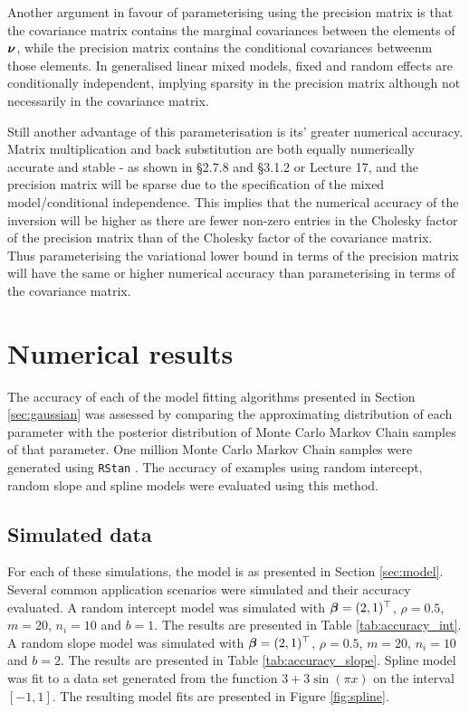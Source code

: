 Another argument in favour of parameterising using the precision matrix is that
the covariance matrix contains the marginal covariances between the elements of
${\boldsymbol \nu}$, while the precision matrix contains the conditional covariances
betweenm those elements. In generalised linear mixed models, fixed and random
effects are conditionally independent, implying sparsity in the precision
matrix although not necessarily in the covariance matrix.

Still another advantage of this parameterisation is its' greater numerical
accuracy.  Matrix multiplication and back substitution are both equally
numerically accurate and stable - as shown in \cite{Golub:1996:MC:248979}
\S2.7.8 and \S3.1.2 or \cite{trefethen97} Lecture 17, and the precision matrix
will be sparse due to the specification of the mixed model/conditional
independence. This implies that the numerical accuracy of the inversion will be
higher as there are fewer non-zero entries in the Cholesky factor of the
precision matrix than of the Cholesky factor of the covariance matrix. Thus
parameterising the variational lower bound in terms of the precision matrix
will have the same or higher numerical accuracy than parameterising in terms of
the covariance matrix.

\section{Numerical results}
\label{sec:results}
The accuracy of each of the model fitting algorithms presented in Section
\ref{sec:gaussian} was assessed by comparing the approximating distribution of
each parameter with the posterior distribution of Monte Carlo Markov Chain
samples of that parameter. One million Monte Carlo Markov Chain samples were
generated using \texttt{RStan} \citep{Carpenter2016, StanDevelopmentTeam2016}.
The accuracy of examples using random intercept, random slope and spline models
were evaluated using this method.
		
\subsection{Simulated data}
For each of these simulations, the model is as presented in Section
\ref{sec:model}. Several common application scenarios were simulated and their
accuracy evaluated. A random intercept model was simulated with ${\boldsymbol \beta} = (2,
1)^\top$, $\rho = 0.5$, $m = 20$, $n_i = 10$ and $b = 1$. The results are
presented in Table \ref{tab:accuracy_int}. A random slope model was simulated
with ${\boldsymbol \beta} = (2, 1)^\top$, $\rho = 0.5$, $m = 20$, $n_i = 10$ and $b = 2$.
The results are presented in Table \ref{tab:accuracy_slope}. Spline model was
fit to a data set generated from the function $3 + 3 \sin{(\pi x)}$ on the
interval $[-1, 1]$. The resulting model fits are presented in Figure
\ref{fig:spline}.
		
